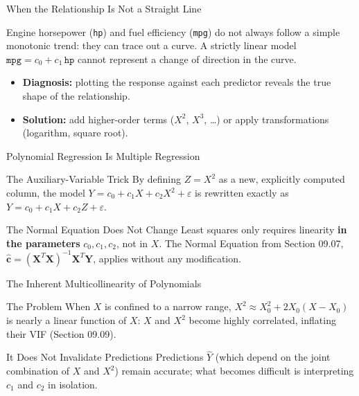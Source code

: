 \documentclass[10pt, aspectratio=169]{beamer}
\begin{document}
\begin{frame}{When the Relationship Is Not a Straight Line}
  \footnotesize
  \begin{motivacion}
    Engine horsepower (\texttt{hp}) and fuel efficiency (\texttt{mpg}) do not always follow a simple monotonic trend: they can trace out a curve. A strictly linear model $\texttt{mpg}=c_0+c_1\,\texttt{hp}$ cannot represent a change of direction in the curve.
  \end{motivacion}

  \vspace{0.15cm}
  \pause
  \begin{itemize}\itemsep=0.1cm
    \item \textbf{Diagnosis:} plotting the response against each predictor reveals the true shape of the relationship. \pause
    \item \textbf{Solution:} add higher-order terms ($X^2$, $X^3$, \ldots) or apply transformations (logarithm, square root).
  \end{itemize}
\end{frame}

\begin{frame}{Polynomial Regression Is Multiple Regression}
  \footnotesize
  \begin{block}{The Auxiliary-Variable Trick}
    By defining $Z=X^2$ as a new, explicitly computed column, the model $Y=c_0+c_1X+c_2X^2+\varepsilon$ is rewritten exactly as $Y=c_0+c_1X+c_2Z+\varepsilon$.
  \end{block}
  \pause

  \vspace{0.1cm}
  \begin{alertblock}{The Normal Equation Does Not Change}
    Least squares only requires linearity \textbf{in the parameters} $c_0,c_1,c_2$, not in $X$. The Normal Equation from Section 09.07, $\hat{\mathbf{c}}=(\mathbf{X}^T\mathbf{X})^{-1}\mathbf{X}^T\mathbf{Y}$, applies without any modification.
  \end{alertblock}
\end{frame}

\begin{frame}{The Inherent Multicollinearity of Polynomials}
  \footnotesize
  \begin{block}{The Problem}
    When $X$ is confined to a narrow range, $X^2\approx X_0^2+2X_0(X-X_0)$ is nearly a linear function of $X$: $X$ and $X^2$ become highly correlated, inflating their VIF (Section 09.09).
  \end{block}
  \pause

  \vspace{0.1cm}
  \begin{alertblock}{It Does Not Invalidate Predictions}
    Predictions $\hat Y$ (which depend on the joint combination of $X$ and $X^2$) remain accurate; what becomes difficult is interpreting $c_1$ and $c_2$ in isolation.
  \end{alertblock}
\end{frame}
\end{document}
